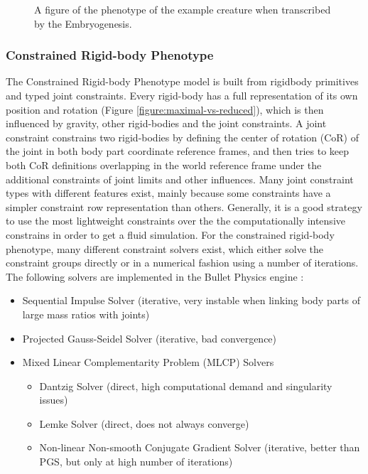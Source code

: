 \documentclass[main]{subfiles}
\begin{document}
\begin{figure}[H]
\centering


\caption[A figure of the phenotype]{A figure of the phenotype of the example creature when transcribed by the Embryogenesis.}
\label{figure:phenotype}
\end{figure}

\subsubsection{Constrained Rigid-body Phenotype}

The Constrained Rigid-body Phenotype model is built from rigidbody primitives and typed joint constraints. %
%
Every rigid-body has a full representation of its own position and rotation (Figure \ref{figure:maximal-vs-reduced}), which is then influenced by gravity, other rigid-bodies and the joint constraints. %
%
A joint constraint constrains two rigid-bodies by defining the center of rotation (CoR) of the joint in both body part coordinate reference frames, and then tries to keep both CoR definitions overlapping in the world reference frame under the additional constraints of joint limits and other influences.  %
%
Many joint constraint types with different features exist, mainly because some constraints have a simpler constraint row representation than others. %
%
Generally, it is a good strategy to use the most lightweight constraints over the the computationally intensive constrains in order to get a fluid simulation. %
%
For the constrained rigid-body phenotype, many different constraint solvers exist, which either solve the constraint groups directly or in a numerical fashion using a number of iterations. %
%
The following solvers are implemented in the Bullet Physics engine \cite{bib::Coumans2014}: 


\begin{itemize}
\item Sequential Impulse Solver (iterative, very instable when linking body parts of large mass ratios with joints) \\ 
\item Projected Gauss-Seidel Solver (iterative, bad convergence) \\
\item Mixed Linear Complementarity Problem (MLCP) Solvers
\begin{itemize}
\item Dantzig Solver (direct, high computational demand and singularity issues)
\item Lemke Solver (direct, does not always converge)
\item Non-linear Non-smooth Conjugate Gradient Solver (iterative, better than PGS, but only at high number of iterations)
\end{itemize}
\end{itemize}
\end{document}
